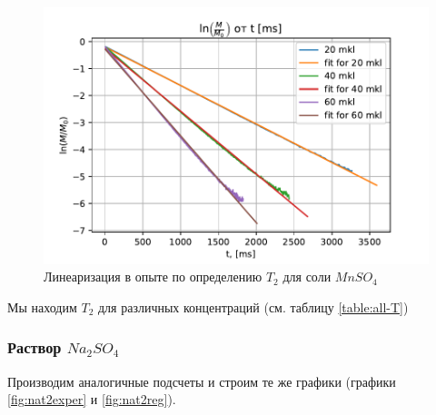 \begin{figure}[!h]
	\hspace{-1em}
	\includegraphics[width=1.0\linewidth]{data/Mn_T_2_reg}
	\caption{Линеаризация в опыте по определению $ T_2 $ для соли $ Mn SO_4 $}
	\label{fig:mnt2reg}
\end{figure}

Мы находим $ T_2 $ для различных концентраций (см. таблицу \ref{table:all-T})
\newpage

\subsubsection{Раствор $Na_2 SO_4$}
Производим аналогичные подсчеты и строим те же графики (графики \ref{fig:nat2exper} и \ref{fig:nat2reg}).

